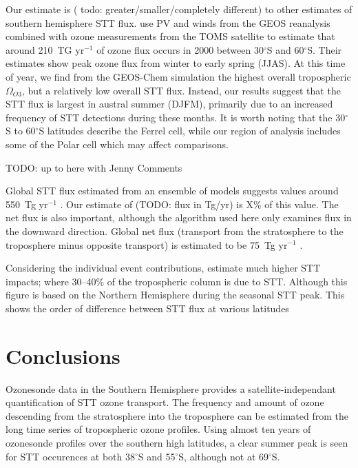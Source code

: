 \documentclass{article}
\begin{document}
  Our estimate is ( todo: greater/smaller/completely different) to other estimates of southern hemisphere STT flux. 
  \citet{Olsen2003} use PV and winds from the GEOS reanalysis combined with ozone measurements from the TOMS satellite to estimate that around 210~TG yr$^{-1}$ of ozone flux occurs in 2000 between 30$^{\circ}$S and 60$^{\circ}$S.
  Their estimates show peak ozone flux from winter to early spring (JJAS). 
  At this time of year, we find from the GEOS-Chem simulation the highest overall tropospheric $\Omega_{O3}$, but a relatively low overall STT flux.
  Instead, our results suggest that the STT flux is largest in austral summer (DJFM), primarily due to an increased frequency of STT detections during these months.
  It is worth noting that the 30$^{\circ}$S to 60$^{\circ}$S latitudes describe the Ferrel cell, while our region of analysis includes some of the Polar cell which may affect comparisons.
  
  TODO: up to here with Jenny Comments
  
  Global STT flux estimated from an ensemble of models suggests values around 550~Tg yr$^{-1}$ \citep{Stevenson2006}.
  Our estimate of (TODO: flux in Tg/yr) is X\% of this value.
  The net flux is also important, although the algorithm used here only examines flux in the downward direction.
  Global net flux (transport from the stratosphere to the troposphere minus opposite transport) is estimated to be 75~Tg yr$^{-1}$ \citep{Sprenger2003}.
  
  Considering the individual event contributions, \citet{Terao2008} estimate much higher STT impacts; where 30--40\% of the tropospheric column is due to STT. 
  Although this figure is based on the Northern Hemisphere during the seasonal STT peak.
  This shows the order of difference between STT flux at various latitudes
  
  
\section{Conclusions}
  
  Ozonesonde data in the Southern Hemisphere provides a satellite-independant quantification of STT ozone transport.
  The frequency and amount of ozone descending from the stratosphere into the troposphere can be estimated from the long time series of tropospheric ozone profiles.
  Using almost ten years of ozonesonde profiles over the southern high latitudes, a clear summer peak is seen for STT occurences at both 38$^{\circ}$S and 55$^{\circ}$S, although not at 69$^{\circ}$S.
  
\end{document}
